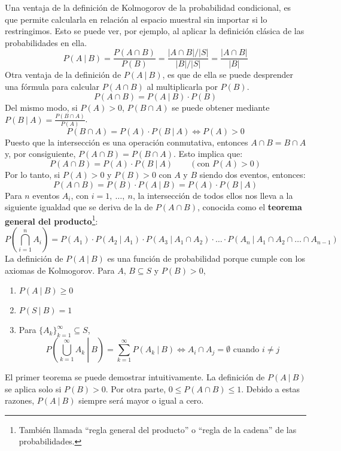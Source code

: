\documentclass[12pt]{article}
\begin{document}
Una ventaja de la definición de Kolmogorov de la probabilidad condicional, es que permite calcularla en relación al espacio muestral sin importar si lo restringimos. Esto se puede ver, por ejemplo, al aplicar la definición clásica de las probabilidades en ella.
\[
  P(A \ | \ B) = \frac{P(A \cap B)}{P(B)} = \frac{|A \cap B| / |S|}{|B| / |S|} = \frac{|A \cap B|}{|B|}
\]
Otra ventaja de la definición de $P(A \ | \ B)$, es que de ella se puede desprender una fórmula para calcular $P(A \cap B)$ al multiplicarla por $P(B)$.
\[
  P(A \cap B) = P(A \ | \ B) \cdot P(B)
\]
Del mismo modo, si $P(A) > 0$, $P(B \cap A)$ se puede obtener mediante $P(B \ | \ A) = \frac{P(B \cap A)}{P(A)}$.
\[
  P(B \cap A) = P(A) \cdot P(B \ | \ A) \iff P(A) > 0
\]
Puesto que la intersección es una operación conmutativa, entonces $A \cap B = B \cap A$ y, por consiguiente, $P(A \cap B) = P(B \cap A)$. Esto implica que:
\[
  P(A \cap B) = P(A) \cdot P(B \ | \ A) \qquad (\text{con } P(A) > 0)
\]
Por lo tanto, si $P(A) > 0$ y $P(B) > 0$ con $A$ y $B$ siendo dos eventos, entonces:
\[
  P(A \cap B) = P(B) \cdot P(A \ | \ B) = P(A) \cdot P(B \ | \ A)
\]
Para $n$ eventos $A_{i}$, con $i = 1, \ \ldots, \ n$, la intersección de todos ellos nos lleva a la siguiente igualdad que se deriva de la de $P(A \cap B)$, conocida como el \textbf{teorema general del producto}\footnote{También llamada ``regla general del producto'' o ``regla de la cadena'' de las probabilidades.}:
\[
  P\left(\bigcap_{i = 1}^{n} A_{i}\right) = P(A_{1}) \cdot P(A_{2} \ | \ A_{1}) \cdot P(A_{3} \ | \ A_{1} \cap A_{2}) \cdot \ldots
                                             \cdot P(A_{n} \ | \ A_{1} \cap A_{2} \cap \ldots \cap A_{n - 1})
\]
La definición de $P(A \ | \ B)$ es una función de probabilidad porque cumple con los axiomas de Kolmogorov. Para $A$, $B \subseteq S$ y $P(B) > 0$,

\begin{enumerate}
\item $P(A \ | \ B) \geq 0$
\item $P(S \ | \ B) = 1$
\item Para $\{A_{k}\}_{k = 1}^{\infty} \subseteq S$,
\[
  P\left(\bigcup_{k = 1}^{\infty} A_{k} \ \left|\right. \ B\right) = \sum_{k = 1}^{\infty} P(A_{k} \ | \ B)
  \iff A_{i} \cap A_{j} = \emptyset \text{ cuando } i \neq j
\]
\end{enumerate}

El primer teorema se puede demostrar intuitivamente. La definición de $P(A \ | \ B)$ se aplica solo si $P(B) > 0$. Por otra parte, $0 \leq P(A \cap B) \leq 1$. Debido a estas razones, $P(A \ | \ B)$ siempre será mayor o igual a cero.
\end{document}
